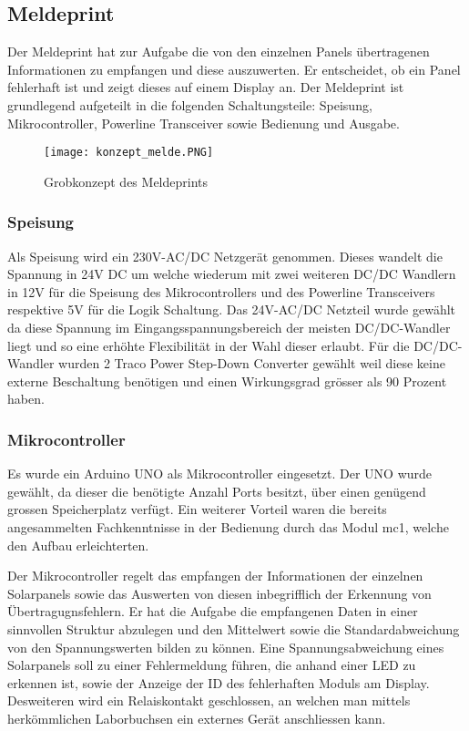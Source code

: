 \subsection{Meldeprint}
Der Meldeprint hat zur Aufgabe die von den einzelnen Panels übertragenen Informationen zu empfangen und diese auszuwerten. Er entscheidet, ob ein Panel fehlerhaft ist und zeigt dieses auf einem Display an. Der Meldeprint ist grundlegend aufgeteilt in die folgenden Schaltungsteile: Speisung, Mikrocontroller, Powerline Transceiver sowie Bedienung und Ausgabe.

\begin{figure}[h]
	\centering
	\texttt{[image: konzept\_melde.PNG]}
	\caption{Grobkonzept des Meldeprints}	
\end{figure}

\subsubsection{Speisung}
Als Speisung wird ein 230V-AC/DC Netzgerät genommen. Dieses wandelt die Spannung in 24V DC um welche wiederum mit zwei weiteren DC/DC Wandlern in 12V für die Speisung des Mikrocontrollers und des Powerline Transceivers respektive 5V für die Logik Schaltung. Das 24V-AC/DC Netzteil wurde gewählt da diese Spannung im Eingangsspannungsbereich der meisten DC/DC-Wandler liegt und so eine erhöhte Flexibilität in der Wahl dieser erlaubt. Für die DC/DC-Wandler wurden 2 Traco Power Step-Down Converter gewählt weil diese keine externe Beschaltung benötigen und einen Wirkungsgrad grösser als 90 Prozent haben.

\subsubsection{Mikrocontroller}
Es wurde ein Arduino UNO als Mikrocontroller eingesetzt. Der UNO wurde gewählt, da dieser die benötigte Anzahl Ports besitzt, über einen genügend grossen Speicherplatz verfügt. Ein weiterer Vorteil waren die bereits angesammelten Fachkenntnisse in der Bedienung durch das Modul mc1, welche den Aufbau erleichterten.

Der Mikrocontroller regelt das empfangen der Informationen der einzelnen Solarpanels sowie das Auswerten von diesen inbegrifflich der Erkennung von Übertragugnsfehlern. Er hat die Aufgabe die empfangenen Daten in einer sinnvollen Struktur abzulegen und den Mittelwert sowie die Standardabweichung von den Spannungswerten bilden zu können. Eine Spannungsabweichung eines Solarpanels soll zu einer Fehlermeldung führen, die anhand einer LED zu erkennen ist, sowie der Anzeige der ID des fehlerhaften Moduls am Display. Desweiteren wird ein Relaiskontakt geschlossen, an welchen man mittels herkömmlichen Laborbuchsen ein externes Gerät anschliessen kann.

